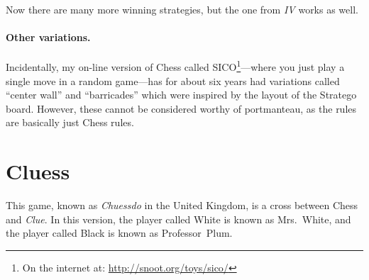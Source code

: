 \documentclass[twocolumn]{article}
\begin{document}
Now there are many more winning strategies, but the one from {\em IV}
works as well.

\paragraph{Other variations.} Incidentally, my on-line version of Chess 
called SICO\footnote{ On the internet at:
  \url{http://snoot.org/toys/sico/}}---where you just play a single
move in a random game---has for about six years had variations called
``center wall'' and ``barricades''\cite{sico} which were inspired by
the layout of the Stratego board. However, these cannot be considered
worthy of portmanteau, as the rules are basically just Chess rules.


\section{Cluess}

This game, known as {\em Chuessdo} in the United Kingdom, is a cross
between Chess and {\em Clue}. In this version, the player called White
is known as Mrs.~White, and the player called Black is known as
Professor~Plum.




% 









{}

\end{document}

